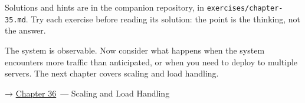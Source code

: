 \noindent{}Solutions and hints are in the companion repository, in \texttt{exercises/}\allowbreak{}\texttt{chapter-35.md}. Try each exercise before reading its solution: the point is the thinking, not the answer.

\label{35-observability:whats-next}

The system is observable. Now consider what happens when the system encounters more traffic than anticipated, or when you need to deploy to multiple servers. The next chapter covers scaling and load handling.

\noindent{}→ \hyperref[ch:36-scaling-load]{Chapter 36}~--- Scaling and Load Handling
